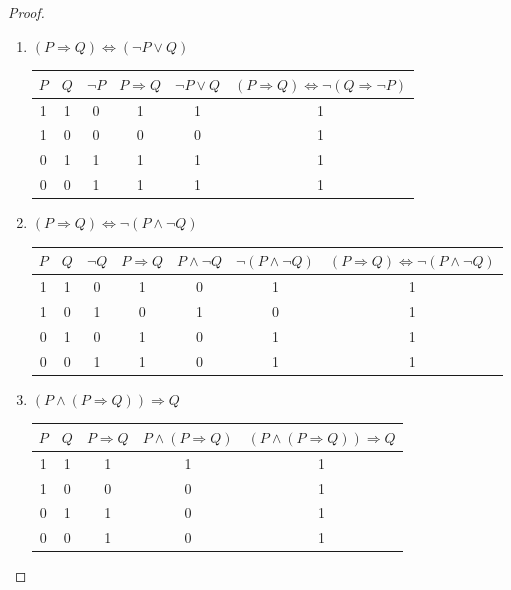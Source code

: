 \documentclass{article}
\begin{document}
\begin{enumerate}
\begin{proof}
\begin{enumerate}
			\par\bigskip
			
			\item[b)] $(P \Rightarrow Q) \iff (\neg P \lor Q)$
			
			\begin{center}
				\begin{tabular}{|c|c|c|c|c|c|}
					\hline
					$P$ & $Q$ & $\neg P$ & $P \Rightarrow Q$ & $\neg P \lor Q$ & $ (P \Rightarrow Q) \iff \neg (Q \Rightarrow \neg P)$ \\
					\hline
					1 & 1 & 0 & 1 & 1 & 1   \\
					1 & 0 & 0 & 0 & 0 & 1   \\
					0 & 1 & 1 & 1 & 1 & 1   \\
					0 & 0 & 1 & 1 & 1 & 1   \\
					\hline
				\end{tabular}
			\end{center}
			
			\item[c)] $(P \Rightarrow Q) \iff \neg(P \land \neg Q)$
			
			\begin{center}
				\begin{tabular}{|c|c|c|c|c|c|c|}
					\hline
					$P$ & $Q$ & $\neg Q$ & $P \Rightarrow Q$ & $P \land \neg Q$ & $\neg (P \land \neg Q)$& $ (P \Rightarrow Q) \iff \neg (P \land \neg Q)$ \\
					\hline
					1 & 1 & 0 & 1 & 0 & 1  & 1 \\
					1 & 0 & 1 & 0 & 1 & 0  & 1\\
					0 & 1 & 0 & 1 & 0 & 1  & 1\\
					0 & 0 & 1 & 1 & 0 & 1  & 1\\
					\hline
				\end{tabular}
			\end{center}
			
			\item[d)] $(P \land (P \Rightarrow Q)) \Rightarrow Q$
			
			\begin{center}
				\begin{tabular}{|c|c|c|c|c|}
					\hline
					$P$ & $Q$ & $P \Rightarrow Q$ & $P \land (P \Rightarrow Q)$ & $(P \land (P \Rightarrow Q)) \Rightarrow Q$ \\
					\hline
					1 & 1 & 1 & 1 & 1  \\
					1 & 0 & 0 & 0 & 1 \\
					0 & 1 & 1 & 0 & 1 \\
					0 & 0 & 1 & 0 & 1 \\
					\hline
				\end{tabular}
			\end{center}
			

\end{enumerate}
\end{proof}
\end{enumerate}
\end{document}
